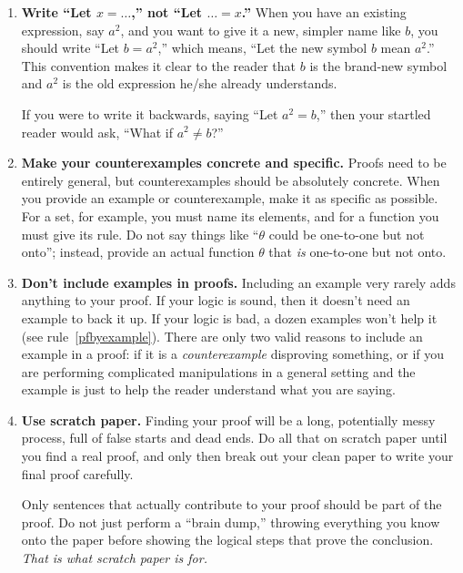 \documentclass[11pt]{article}
\begin{document}
\begin{enumerate}
\item \textbf{Write ``Let $x=\dots$,'' not ``Let $\dots=x$.''} 
        When you have an existing expression, say $a^{2}$,
        and you want to give it a new, simpler name like $b$,
        you should write ``Let $b=a^{2}$,''
        which means, ``Let the new symbol $b$ mean $a^{2}$.''
        This convention makes it clear to the reader that $b$ is the brand-new symbol
        and $a^{2}$ is the old expression he/she already understands.
        
        If you were to write it backwards, saying ``Let $a^{2}=b$,''
        then your startled reader would ask,
        ``What if $a^{2}\neq b$?''
  
\item \textbf{Make your counterexamples concrete and specific.}
        Proofs need to be entirely general,
        but counterexamples should be absolutely concrete.
        When you provide an example or counterexample,
        make it as specific as possible.
        For a set, for example, you must name its elements,
        and for a function you must give its rule.
        Do not say things like ``$\theta$ could be one-to-one but not onto'';
        instead, provide an actual function $\theta$ that \emph{is} one-to-one but not onto.
    
\item \textbf{Don't include examples in proofs.}
        Including an example very rarely adds anything to your proof.
        If your logic is sound, then it doesn't need an example to back it up.
        If your logic is bad, a dozen examples won't help it (see rule~\ref{pfbyexample}).
        There are only two valid reasons to include an example in a proof:
        if it is a \emph{counterexample} disproving something,
        or if you are performing complicated manipulations in a general setting
        and the example is just to help the reader understand what you are saying.

 \item \textbf{Use scratch paper.}
        Finding your proof will be a long, potentially messy process, 
        full of false starts and dead ends.
        Do all that on scratch paper
        until you find a real proof,
        and only then break out your clean paper to write your final proof carefully.
        
        Only sentences that actually contribute to your proof 
        should be part of the proof.
        Do not just perform a ``brain dump,''
        throwing everything you know onto the paper
        before showing the logical steps that prove the conclusion.
        \emph{That is what scratch paper is for.}

\end{enumerate}
\end{document}
